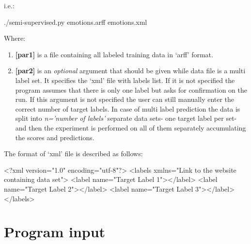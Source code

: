 i.e.:

\begin{spverbatim}
    ./semi-supervised.py emotions.arff emotions.xml
\end{spverbatim}

Where:

\begin{enumerate}
\item \textbf{[par1]} is a file containing all labeled training data in `arff' format.

\item \textbf{[par2]} is an \emph{optional} argument that should be given while data file is a multi label set. It specifies the `xml' file with labels list. If it is not specified the program assumes that there is only one label but asks for confirmation on the run. If this argument is not specified the user can still manually enter the correct number of target labels. In case of multi label prediction the data is split into \emph{n='number of labels'} separate data sets- one target label per set- and then the experiment is performed on all of them separately accumulating the scores and predictions.

\end{enumerate}

The format of `xml' file is described as follows:

\begin{spverbatim}
    <?xml version="1.0" encoding="utf-8"?>
    <labels xmlns="Link to the website containing data set">
    <label name="Target Label 1"></label>
    <label name="Target Label 2"></label>
    <label name="Target Label 3"></label>
    </labels>
\end{spverbatim}

\section*{Program input}


